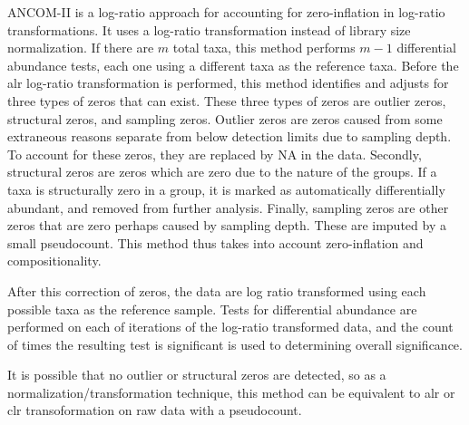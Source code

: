 \documentclass[
]{book}
\begin{document}
ANCOM-II \citep{kaul2017} is a log-ratio approach for accounting for zero-inflation in log-ratio transformations. It uses a log-ratio transformation instead of library size normalization. If there are \(m\) total taxa, this method performs \(m-1\) differential abundance tests, each one using a different taxa as the reference taxa. Before the alr log-ratio transformation is performed, this method identifies and adjusts for three types of zeros that can exist. These three types of zeros are outlier zeros, structural zeros, and sampling zeros. Outlier zeros are zeros caused from some extraneous reasons separate from below detection limits due to sampling depth. To account for these zeros, they are replaced by NA in the data. Secondly, structural zeros are zeros which are zero due to the nature of the groups. If a taxa is structurally zero in a group, it is marked as automatically differentially abundant, and removed from further analysis. Finally, sampling zeros are other zeros that are zero perhaps caused by sampling depth. These are imputed by a small pseudocount. This method thus takes into account zero-inflation and compositionality.

After this correction of zeros, the data are log ratio transformed using each possible taxa as the reference sample. Tests for differential abundance are performed on each of iterations of the log-ratio transformed data, and the count of times the resulting test is significant is used to determining overall significance.

It is possible that no outlier or structural zeros are detected, so as a normalization/transformation technique, this method can be equivalent to alr or clr transoformation on raw data with a pseudocount.
\end{document}
